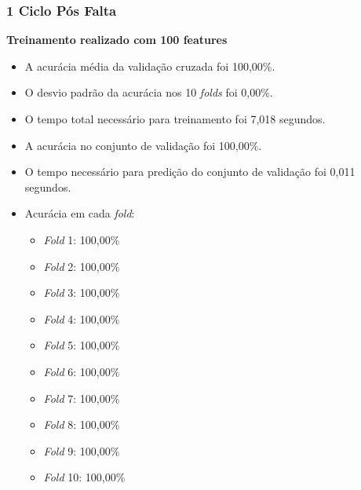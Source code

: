 \subsubsection{1 Ciclo Pós Falta}
\textbf{Treinamento realizado com 100 features}
\begin{itemize}
    \item A acurácia média da validação cruzada foi 100,00\%.
    \item O desvio padrão da acurácia nos 10 \textit{folds} foi 0,00\%.
    \item O tempo total necessário para treinamento foi 7,018 segundos.
    \item A acurácia no conjunto de validação foi 100,00\%.
    \item O tempo necessário para predição do conjunto de validação foi 0,011 segundos.
    \item Acurácia em cada \textit{fold}:
    \begin{itemize}
        \item \textit{Fold} 1: 100,00\%
        \item \textit{Fold} 2: 100,00\%
        \item \textit{Fold} 3: 100,00\%
        \item \textit{Fold} 4: 100,00\%
        \item \textit{Fold} 5: 100,00\%
        \item \textit{Fold} 6: 100,00\%
        \item \textit{Fold} 7: 100,00\%
        \item \textit{Fold} 8: 100,00\%
        \item \textit{Fold} 9: 100,00\%
        \item \textit{Fold} 10: 100,00\%
    \end{itemize}
\end{itemize}


